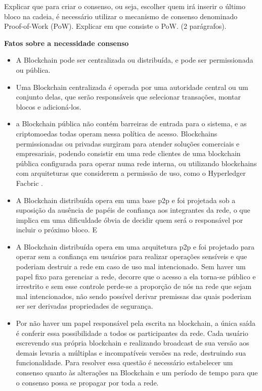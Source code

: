 \documentclass[a4paper,11pt]{article}
\begin{document}

{\color{ForestGreen}Explicar que para criar o consenso, ou seja, escolher quem irá inserir o último bloco na cadeia, é necessário utilizar o mecanismo de consenso denominado Proof-of-Work (PoW). Explicar em que consiste o PoW. (2 parágrafos).}

\textbf{Fatos sobre a necessidade consenso}

\begin{itemize}
    \item A Blockchain pode ser centralizada ou distribuída, e pode ser permissionada ou pública.
    \item Uma Blockchain centralizada é operada por uma autoridade central ou um conjunto delas, que serão responsáveis que selecionar transações, montar blocos e adicioná-los.
    \item a Blockchain pública não contém barreiras de entrada para o sistema, e as criptomoedas todas operam nessa política de acesso. Blockchains permissionadas ou privadas surgiram para atender soluções comerciais e empresariais, podendo consistir em uma rede clientes de uma blockchain pública configurada para operar numa rede interna, ou utilizando blockchains com arquiteturas que considerem a permissão de uso, como o Hyperledger Facbric \cite{Indeterminado2019}.
    \item A Blockchain distribuída opera em uma base p2p e foi projetada sob a suposição da ausência de papéis de confiança aos integrantes da rede, o que implica em uma dificuldade óbvia de decidir quem será o responsável por incluir o próximo bloco. E
    \item A Blockchain distribuída opera em uma arquitetura p2p e foi projetado para operar sem a confiança em usuários para realizar operações sensíveis e que poderiam destruir a rede em caso de uso mal intencionado. Sem haver um papel fixo para gerenciar a rede, decorre que o acesso a ela torna-se público e irrestrito e sem esse controle perde-se a proporção de nós na rede que sejam mal intencionados, não sendo possível derivar premissas das quais poderiam ser ser derivadas propriedades de segurança.
    \item Por não haver um papel responsável pela escrita na blockchain, a única saída é conferir essa possibilidade a todos os participantes da rede. Cada usuário escrevendo sua própria blockchain e realizando broadcast de sua versão aos demais levaria a múltiplas e incompatíveis versões na rede, destruindo sua funcionalidade. Para resolver essa questão é necessário estabelecer um consenso quanto às alterações na Blockchain   e um período de tempo para que o consenso possa se propagar por toda a rede.

\end{itemize}
\end{document}
